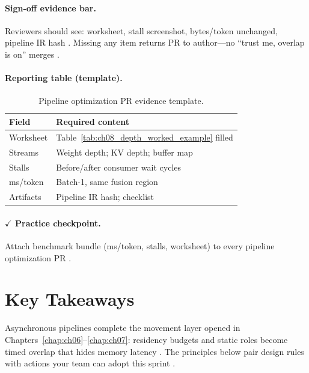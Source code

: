 \paragraph{Sign-off evidence bar.}
Reviewers should see: worksheet, stall screenshot, bytes/token unchanged, pipeline IR hash \citep{yirage2026,shah2024flashattention3,semianalysis2024tma}.
Missing any item returns PR to author---no ``trust me, overlap is on'' merges \citep{chen2020compilerbasedhardw,taxbreak2026,patel2025llminference}.

\paragraph{Reporting table (template).}
\begin{table}[t]
\centering
\small
\caption{Pipeline optimization PR evidence template.}
\label{tab:ch08_pr_template}
\begin{tabular}{@{}ll@{}}
\toprule
\textbf{Field} & \textbf{Required content} \\
\midrule
Worksheet & Table~\ref{tab:ch08_depth_worked_example} filled \\
Streams & Weight depth; KV depth; buffer map \\
Stalls & Before/after consumer wait cycles \\
ms/token & Batch-1, same fusion region \\
Artifacts & Pipeline IR hash; checklist \\
\bottomrule
\end{tabular}
\end{table}

\paragraph{$\checkmark$ Practice checkpoint.}
Attach benchmark bundle (ms/token, stalls, worksheet) to every pipeline optimization PR \citep{yirage2026,chen2020compilerbasedhardw,taxbreak2026}.

\section{Key Takeaways}
\label{sec:ch08_key_takeaways}

Asynchronous pipelines complete the movement layer opened in Chapters~\ref{chap:ch06}--\ref{chap:ch07}: residency budgets and static roles become timed overlap that hides memory latency \citep{yirage2026,shah2024flashattention3,semianalysis2024tma,dao2022flashattention}.
The principles below pair design rules with actions your team can adopt this sprint \citep{chen2020compilerbasedhardw,taxbreak2026,memoryfloor2026,patel2025llminference}.

